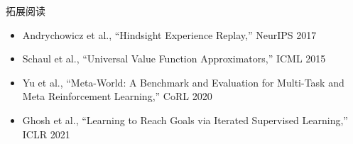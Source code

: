 \documentclass[a4paper]{article}
\begin{document}
\begin{knowledgebox}{拓展阅读}
\begin{itemize}
    \item Andrychowicz et al., ``Hindsight Experience Replay,'' NeurIPS 2017
    \item Schaul et al., ``Universal Value Function Approximators,'' ICML 2015
    \item Yu et al., ``Meta-World: A Benchmark and Evaluation for Multi-Task and Meta Reinforcement Learning,'' CoRL 2020
    \item Ghosh et al., ``Learning to Reach Goals via Iterated Supervised Learning,'' ICLR 2021
\end{itemize}
\end{knowledgebox}
\end{document}
